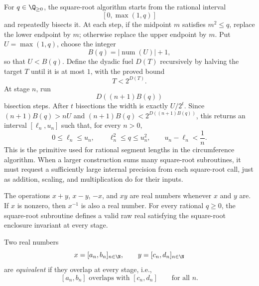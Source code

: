 \begin{definition}\label{def:sqrt-subroutine}
For \(q\in\Q_{\ge 0}\), the square-root algorithm starts from the rational
interval
\[
  [0,\max(1,q)]
\]
and repeatedly bisects it.  At each step, if the midpoint \(m\) satisfies
\(m^2\le q\), replace the lower endpoint by \(m\); otherwise replace the upper
endpoint by \(m\).  Put \(U=\max(1,q)\), choose the integer
\[
B(q)=|\operatorname{num}(U)|+1,
\]
so that \(U<B(q)\).  Define the dyadic fuel \(D(T)\) recursively by halving
the target \(T\) until it is at most \(1\), with the proved bound
\[
  T<2^{D(T)}.
\]
At stage \(n\), run
\[
  D((n+1)B(q))
\]
bisection steps.  After \(t\) bisections the width is exactly \(U/2^t\).  Since
\((n+1)B(q)>nU\) and \((n+1)B(q)<2^{D((n+1)B(q))}\), this returns an
interval \([\ell_n,u_n]\) such that, for every \(n>0\),
\[
  0\le \ell_n\le u_n,\qquad
  \ell_n^2\le q\le u_n^2,\qquad
  u_n-\ell_n<\frac1n.
\]
This is the primitive used for rational segment lengths in the circumference
algorithm.  When a larger construction sums many square-root subroutines, it
must request a sufficiently large internal precision from each square-root
call, just as addition, scaling, and multiplication do for their inputs.
\end{definition}


\begin{proposition}\label{prop:raw-arithmetic-valid}
The operations \(x+y\), \(x-y\), \(-x\), and \(xy\) are real numbers
whenever \(x\) and \(y\) are.  If \(x\) is nonzero, then \(x^{-1}\)
is also a real number.  For every rational \(q\ge 0\), the square-root
subroutine defines a valid raw real satisfying the square-root enclosure
invariant at every stage.
\end{proposition}

\begin{definition}\label{def:raw-equiv}
Two real numbers
\[
  x=[a_n,b_n]_{n\in\N},\qquad y=[c_n,d_n]_{n\in\N}
\]
are \emph{equivalent} if they overlap at every stage, i.e.,
\[
  [a_n,b_n] \mbox{ overlaps with } [c_n,d_n]
  \qquad\text{for all }n.
\]
\end{definition}

